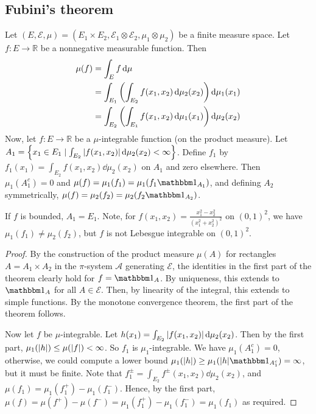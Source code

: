 \subsection{Fubini's theorem}
\begin{theorem}
	Let \( (E, \mathcal E, \mu) = (E_1 \times E_2, \mathcal E_1 \otimes \mathcal E_2, \mu_1 \otimes \mu_2) \) be a finite measure space.
	Let \( f \colon E \to \mathbb R \) be a nonnegative measurable function.
	Then
	\begin{align*}
		\mu(f) &= \int_E f \dd{\mu} \\
		&= \int_{E_1} \qty( \int_{E_2} f(x_1,x_2) \dd{\mu_2(x_2)} ) \dd{\mu_1(x_1)} \\
		&= \int_{E_2} \qty( \int_{E_1} f(x_1,x_2) \dd{\mu_1(x_1)} ) \dd{\mu_2(x_2)}
	\end{align*}
	Now, let \( f \colon E \to \mathbb R \) be a \( \mu \)-integrable function (on the product measure).
	Let \( A_1 = \qty{x_1 \in E_1 \mid \int_{E_2} \abs{f(x_1,x_2)} \dd{\mu_2(x_2)} < \infty} \).
	Define \( f_1 \) by \( f_1(x_1) = \int_{E_2} f(x_1,x_2) \dd{\mu_2(x_2)} \) on \( A_1 \) and zero elsewhere.
	Then \( \mu_1(A_1^c) = 0 \) and \( \mu(f) = \mu_1(f_1) = \mu_1(f_1 \mathbbm 1_{A_1}) \), and defining \( A_2 \) symmetrically, \( \mu(f) = \mu_2(f_2) = \mu_2(f_2 \mathbbm 1_{A_2}) \).
\end{theorem}
\begin{remark}
	If \( f \) is bounded, \( A_1 = E_1 \).
	Note, for \( f(x_1,x_2) = \frac{x_1^2-x_2^2}{(x_1^2+x_2^2)^2} \) on \( (0,1)^2 \), we have \( \mu_1(f_1) \neq \mu_2(f_2) \), but \( f \) is not Lebesgue integrable on \( (0,1)^2 \).
\end{remark}
\begin{proof}
	By the construction of the product measure \( \mu(A) \) for rectangles \( A = A_1 \times A_2 \) in the \( \pi \)-system \( \mathcal A \) generating \( \mathcal E \), the identities in the first part of the theorem clearly hold for \( f = \mathbbm 1_A \).
	By uniqueness, this extends to \( \mathbbm 1_A \) for all \( A \in \mathcal E \).
	Then, by linearity of the integral, this extends to simple functions.
	By the monotone convergence theorem, the first part of the theorem follows.

	Now let \( f \) be \( \mu \)-integrable.
	Let \( h(x_1) = \int_{E_2} \abs{f(x_1,x_2)} \dd{\mu_2(x_2)} \).
	Then by the first part, \( \mu_1(\abs{h}) \leq \mu(\abs{f}) < \infty \).
	So \( f_1 \) is \( \mu_1 \)-integrable.
	We have \( \mu_1(A_1^c) = 0 \), otherwise, we could compute a lower bound \( \mu_1(\abs{h}) \geq \mu_1(\abs{h} \mathbbm 1_{A_1^c}) = \infty \), but it must be finite.
	Note that \( f_1^\pm = \int_{E_2} f^\pm(x_1,x_2) \dd{\mu_2(x_2)} \), and \( \mu(f_1) = \mu_1(f_1^+) - \mu_1(f_1^-) \).
	Hence, by the first part, \( \mu(f) = \mu(f^+) - \mu(f^-) = \mu_1(f_1^+) - \mu_1(f_1^-) = \mu_1(f_1) \) as required.
\end{proof}
